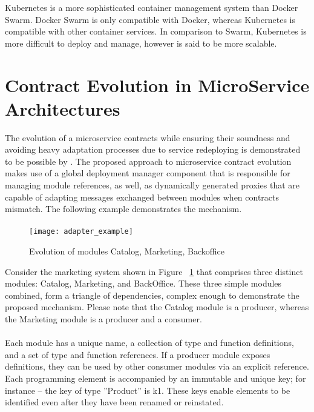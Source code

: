 Kubernetes is a more sophisticated container management system than Docker Swarm.
Docker Swarm is only compatible with Docker, whereas Kubernetes is compatible with other container services.
In comparison to Swarm, Kubernetes is more difficult to deploy and manage, however is said to be more scalable.


\section{Contract Evolution in MicroService Architectures} %
\label{sec:contract_evolution_in_microservice_architectures}

The evolution of a microservice contracts while ensuring their soundness and
avoiding heavy adaptation processes due to service redeploying is demonstrated to be possible by \citeauthor{seco2020robust} \cite{seco2020robust}.
The proposed approach to microservice contract evolution \cite{seco2020robust} makes use of a global deployment manager component that is responsible for managing module references,
as well, as dynamically generated proxies that are capable of adapting messages exchanged between modules when contracts mismatch.
The following example demonstrates the mechanism.

\paragraph{}

\begin{figure}[htbp]
    \centering
    \texttt{[image: adapter\_example]}
    \caption{Evolution of modules Catalog, Marketing, Backoffice \cite{seco2020robust}}
    \label{fig:evolution_of_modules}
\end{figure}

Consider the marketing system shown in Figure ~\ref{fig:evolution_of_modules} that comprises three distinct modules: Catalog, Marketing, and BackOffice.
These three simple modules combined, form a triangle of dependencies, complex enough to demonstrate the proposed mechanism.
Please note that the Catalog module is a producer, whereas the Marketing module is a producer and a consumer.

\paragraph{}

Each module has a unique name, a collection of type and function definitions, and a set of type and function references.
If a producer module exposes definitions, they can be used by other consumer modules via an explicit reference.
Each programming element is accompanied by an immutable and unique key; for instance – the key of type ''Product'' is k1.
These keys enable elements to be identified even after they have been renamed or reinstated.

